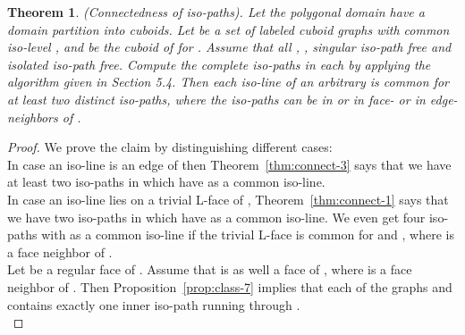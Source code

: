 \documentclass[a4paper,11pt]{article}
\newtheorem{theorem}{Theorem}[section]
\begin{document}
\begin{theorem}\label{thm:connect-4}(Connectedness of iso-paths).
Let the polygonal domain  have a domain partition 
into cuboids. Let  be a set of labeled
cuboid graphs with common iso-level , and  be the cuboid of  for .
Assume that all , , singular iso-path free and isolated iso-path free.
Compute the complete iso-paths in each  by applying the algorithm given in Section 5.4.
Then each iso-line of an arbitrary  is common for at least two distinct iso-paths, where
the iso-paths can be in  or in face- or in edge-neighbors of .
\end{theorem}
\begin{proof} We prove the claim by distinguishing different cases:\\

 In case an iso-line  is an edge of  then
Theorem~\ref{thm:connect-3} says that we have at least two iso-paths in  which have 
as a common iso-line.\\

 In case an iso-line  lies on a trivial L-face of ,
Theorem~\ref{thm:connect-1} says that we have two iso-paths in  which have  as a common iso-line.
We even get four iso-paths with  as a common iso-line if the trivial L-face is common for  and
, where  is a face neighbor of .\\

 Let  be a regular face of . Assume that  is as well a face
of , where  is a face neighbor of . Then Proposition~\ref{prop:class-7}
implies that each of the graphs  and  contains exactly one inner iso-path running through .\\


\end{proof}
\end{document}
